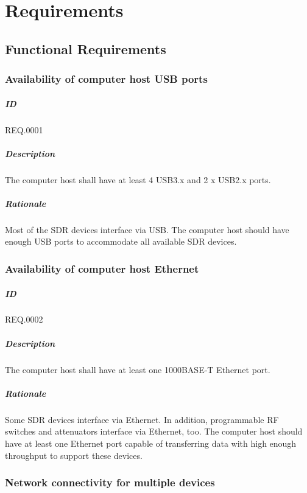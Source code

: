 \documentclass[english,titlepage,a4paper]{report}
\begin{document}
\chapter{Requirements} \label{chapter_4}
\section{Functional Requirements}

\subsection{Availability of computer host USB ports}
\paragraph{ID}
REQ.0001
\paragraph{Description}
The computer host shall have at least 4 USB3.x and 2 x USB2.x ports.
\paragraph{Rationale}
Most of the SDR devices interface via USB.
The computer host should have enough USB ports to accommodate all available SDR devices.

\subsection{Availability of computer host Ethernet}
\paragraph{ID}
REQ.0002
\paragraph{Description}
The computer host shall have at least one 1000BASE‑T Ethernet port.
\paragraph{Rationale}
Some SDR devices interface via Ethernet.
In addition, programmable RF switches and attenuators interface via Ethernet, too.
The computer host should have at least one Ethernet port capable of transferring data with high enough throughput to support these devices.

\subsection{Network connectivity for multiple devices}
\end{document}
